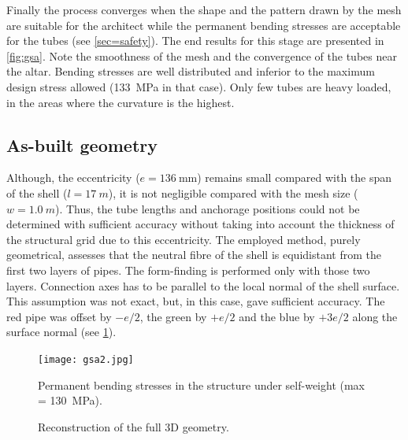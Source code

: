 Finally the process converges when the shape and the pattern drawn by the mesh are suitable for the architect while the permanent bending stresses are acceptable for the tubes (see \cref{sec=safety}). The end results for this stage are presented in \cref{fig:gsa}. Note the smoothness of the mesh and the convergence of the tubes near the altar. Bending stresses are well distributed and inferior to the maximum design stress allowed (\SI{133}{MPa} in that case). Only few tubes are heavy loaded, in the areas where the curvature is the highest.

\subsection{As-built geometry}\label{sec=asbuilt}
Although, the eccentricity ($e = \SI{136}{\mm}$) remains small compared with the span of the shell ($l =\SI{17}{m}$), it is not negligible compared with the mesh size ($w = \SI{1.0}{m}$). Thus, the tube lengths and anchorage positions could not be determined with sufficient accuracy without taking into account the thickness of the structural grid due to this eccentricity. The employed method, purely geometrical, assesses that the neutral fibre of the shell is equidistant from the first two layers of pipes. The form-finding is performed only with those two layers. Connection axes has to be parallel to the local normal of the shell surface. This assumption was not exact, but, in this case, gave sufficient accuracy. The red pipe was offset by $-e/2$, the green by $+e/2$ and the blue by $+3e/2$ along the surface normal (see \cref{fig:eccentricity}).
\begin{figure}[p]
     	\centering
	\begin{fullpage}
		\texttt{[image: gsa2.jpg]}
		\caption[Permanent bending stresses in the structure under self-weight]{Permanent bending stresses in the structure under self-weight (max = \SI{130}{MPa}).}
		\label{fig:gsa}
		\vspace{1.5cm}
		\hspace*{\fill}
		\vspace{0.5cm}
		\caption[Reconstruction of the full 3D geometry]{Reconstruction of the full 3D geometry.}
		\label{fig:eccentricity}    
	\end{fullpage}
\end{figure}
